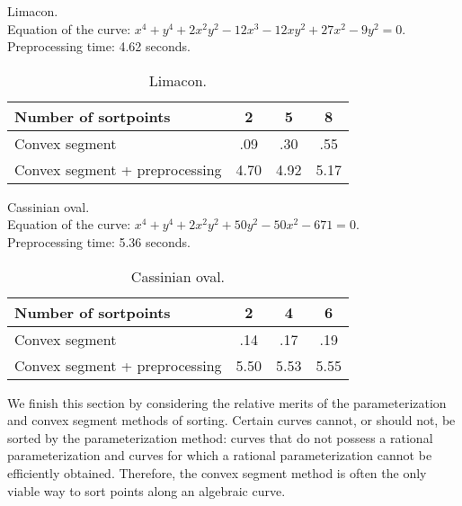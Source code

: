 \begin{example}
\label{eg-limacon}
{\samepage
Limacon.\\
\indent Equation of the curve: $x^{4} + y^{4} + 2x^{2}y^{2} - 
	12x^{3} - 12xy^{2} + 
	27x^{2} - 9y^{2} = 0$.\\
\indent Preprocessing time: 4.62 seconds.

}
\begin{table}[htbp]
\caption{Limacon.}
\begin{center}
\begin{tabular}{|l|c|c|c|} \hline
Number of sortpoints & 2 & 5 & 8 \\ \hline \hline
Convex segment & .09 & .30 & .55 \\ \hline
Convex segment + preprocessing & 4.70 & 4.92 & 5.17 \\ \hline
\end{tabular}
\end{center}
\end{table}
\end{example}

\begin{example}
\label{eg-Cassinian}
{\samepage
Cassinian oval.\\
\indent Equation of the curve: $x^{4} + y^{4} + 2x^{2}y^{2} + 50y^{2} - 
	50x^{2}-671 = 0$.\\
\indent Preprocessing time: 5.36 seconds.

}
\begin{table}[htbp]
\caption{Cassinian oval.}
\begin{center}
\begin{tabular}{|l|c|c|c|} \hline
Number of sortpoints & 2 & 4 & 6 \\ \hline \hline
Convex segment & .14 & .17 & .19 \\ \hline
Convex segment + preprocessing & 5.50 & 5.53 & 5.55 \\ \hline
\end{tabular}
\end{center}
\end{table}
\end{example}

\vspace{.2in}

We finish this section by considering the relative merits of the 
parameterization and 
convex segment methods of sorting.
Certain curves cannot, or should 
not, be sorted by the parameterization method: curves that 
do not possess a rational parameterization and curves for which
a rational parameterization cannot be efficiently obtained.
Therefore, the convex segment method is often 
the only viable way to sort points along an algebraic curve.

